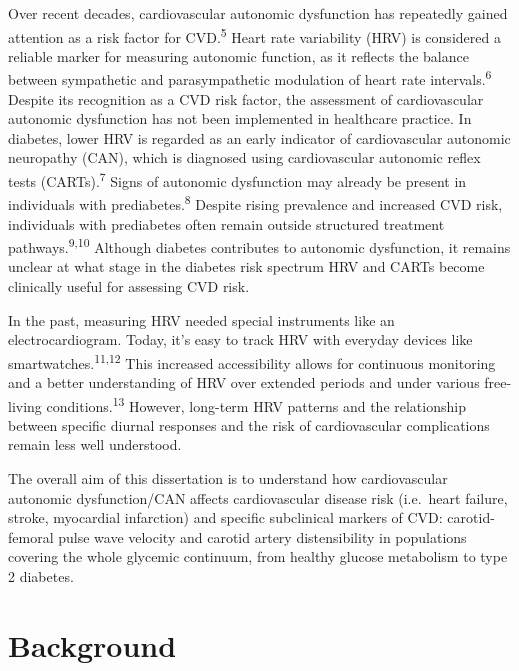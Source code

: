 \documentclass[
  a4paper,
  headsepline=true,
  open=left]{scrbook}
\begin{document}
Over recent decades, cardiovascular autonomic dysfunction has repeatedly
gained attention as a risk factor for CVD.\textsuperscript{5} Heart rate
variability (HRV) is considered a reliable marker for measuring
autonomic function, as it reflects the balance between sympathetic and
parasympathetic modulation of heart rate intervals.\textsuperscript{6}
Despite its recognition as a CVD risk factor, the assessment of
cardiovascular autonomic dysfunction has not been implemented in
healthcare practice. In diabetes, lower HRV is regarded as an early
indicator of cardiovascular autonomic neuropathy (CAN), which is
diagnosed using cardiovascular autonomic reflex tests
(CARTs).\textsuperscript{7} Signs of autonomic dysfunction may already
be present in individuals with prediabetes.\textsuperscript{8} Despite
rising prevalence and increased CVD risk, individuals with prediabetes
often remain outside structured treatment
pathways.\textsuperscript{9,10} Although diabetes contributes to
autonomic dysfunction, it remains unclear at what stage in the diabetes
risk spectrum HRV and CARTs become clinically useful for assessing CVD
risk.

In the past, measuring HRV needed special instruments like an
electrocardiogram. Today, it's easy to track HRV with everyday devices
like smartwatches.\textsuperscript{11,12} This increased accessibility
allows for continuous monitoring and a better understanding of HRV over
extended periods and under various free-living
conditions.\textsuperscript{13} However, long-term HRV patterns and the
relationship between specific diurnal responses and the risk of
cardiovascular complications remain less well understood.

The overall aim of this dissertation is to understand how cardiovascular
autonomic dysfunction/CAN affects cardiovascular disease risk
(i.e.~heart failure, stroke, myocardial infarction) and specific
subclinical markers of CVD: carotid-femoral pulse wave velocity and
carotid artery distensibility in populations covering the whole glycemic
continuum, from healthy glucose metabolism to type 2 diabetes.

\clearpage
\null
\thispagestyle{empty}
\clearpage


\hypertarget{background}{%
\chapter{Background}\label{background}}
\end{document}
